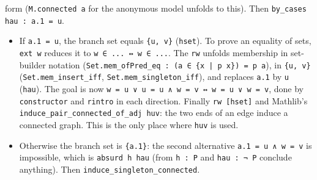 \documentclass[11pt,a4paper]{article}
\newcommand{\lean}[1]{\texttt{\textcolor{leanink}{#1}}}
\begin{document}
form (\lean{M.connected a} for the anonymous model unfolds to this). Then \lean{by\_\allowbreak{}cases hau : a.1 = u}.
\begin{itemize}
\item If \lean{a.1 = u}, the branch set equals \lean{\{u, v\}} (\lean{hset}). To prove an equality of
  sets, \lean{ext w} reduces it to \lean{w ∈ ... ↔ w ∈ ...}. The \lean{rw} unfolds membership in
  set-builder notation (\lean{Set.mem\_\allowbreak{}ofPred\_\allowbreak{}eq : (a ∈ \{x | p x\}) = p a}), in
  \lean{\{u, v\}} (\lean{Set.mem\_\allowbreak{}insert\_\allowbreak{}iff}, \lean{Set.mem\_\allowbreak{}singleton\_\allowbreak{}iff}), and replaces
  \lean{a.1} by \lean{u} (\lean{hau}). The goal is now
  \lean{w = u ∨ u = u ∧ w = v ↔ w = u ∨ w = v}, done by \lean{constructor} and \lean{rintro} in each
  direction. Finally \lean{rw [hset]} and Mathlib's \lean{induce\_\allowbreak{}pair\_\allowbreak{}connected\_\allowbreak{}of\_\allowbreak{}adj huv}:
  the two ends of an edge induce a connected graph. This is the only place where \lean{huv} is used.
\item Otherwise the branch set is \lean{\{a.1\}}: the second alternative \lean{a.1 = u ∧ w = v} is
  impossible, which is \lean{absurd h hau} (from \lean{h : P} and \lean{hau : ¬ P} conclude
  anything). Then \lean{induce\_\allowbreak{}singleton\_\allowbreak{}connected}.
\end{itemize}
\end{document}
